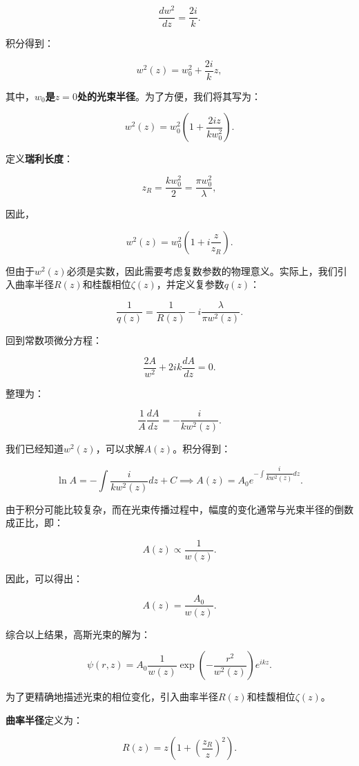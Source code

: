 \begin{enumerate}
\begin{enumerate}
\begin{itemize}
			\[
			\dfrac{d w^2}{d z} = \dfrac{2 i}{k}.
			\]
			
			积分得到：
			
			\[
			w^2(z) = w_0^2 + \dfrac{2 i}{k} z,
			\]
			
			其中，\textbf{\(w_0\)是\(z = 0\)处的光束半径}。为了方便，我们将其写为：
			
			\[
			w^2(z) = w_0^2 \left( 1 + \dfrac{2 i z}{k w_0^2} \right).
			\]
			
			定义\textbf{瑞利长度}：
			
			\[
			z_R = \dfrac{k w_0^2}{2} = \dfrac{\pi w_0^2}{\lambda},
			\]
			
			因此，
			
			\[
			w^2(z) = w_0^2 \left( 1 + i \dfrac{z}{z_R} \right).
			\]
			
			但由于\(w^2(z)\)必须是实数，因此需要考虑复数参数的物理意义。实际上，我们引入曲率半径\(R(z)\)和桂馥相位\(\zeta(z)\)，并定义复参数\(q(z)\)：
			
			\[
			\dfrac{1}{q(z)} = \dfrac{1}{R(z)} - i \dfrac{\lambda}{\pi w^2(z)}.
			\]
			
			回到常数项微分方程：
			
			\[
			\dfrac{2 A}{w^2} + 2 i k \dfrac{d A}{d z} = 0.
			\]
			
			整理为：
			
			\[
			\dfrac{1}{A} \dfrac{d A}{d z} = - \dfrac{i}{k w^2(z)}.
			\]
			
			我们已经知道\(w^2(z)\)，可以求解\(A(z)\)。积分得到：
			
			\[
			\ln A = - \int \dfrac{i}{k w^2(z)} d z + C \implies A(z) = A_0 e^{- \int \dfrac{i}{k w^2(z)} d z}.
			\]
			
			由于积分可能比较复杂，而在光束传播过程中，幅度的变化通常与光束半径的倒数成正比，即：
			
			\[
			A(z) \propto \dfrac{1}{w(z)}.
			\]
			
			因此，可以得出：
			
			\[
			A(z) = \dfrac{A_0}{w(z)}.
			\]
			
			综合以上结果，高斯光束的解为：
			
			\[
			\psi(r, z) = A_0 \dfrac{1}{w(z)} \exp \left( - \dfrac{r^2}{w^2(z)} \right) e^{i k z}.
			\]
			
			为了更精确地描述光束的相位变化，引入曲率半径\(R(z)\)和桂馥相位\(\zeta(z)\)。
			
			\textbf{曲率半径}定义为：
			
			\[
			R(z) = z \left( 1 + \left( \dfrac{z_R}{z} \right)^2 \right).
			\]
			

\end{itemize}
\end{enumerate}
\end{enumerate}
